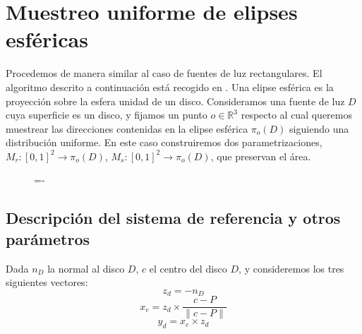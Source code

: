 \section{Muestreo uniforme de elipses esféricas}

Procedemos de manera similar al caso de fuentes de luz rectangulares. El algoritmo descrito a continuación está recogido en \cite{Guillen2017}. Una elipse esférica es la proyección sobre la esfera unidad de un disco. Consideramos una fuente de luz $D$ cuya superficie es un disco, y fijamos un punto $o\in\mathds{R}^3$ respecto al cual queremos muestrear las direcciones contenidas en la elipse esférica $\pi_o(D)$ siguiendo una distribución uniforme. En este caso construiremos dos parametrizaciones, $M_r:[0,1]^2\rightarrow \pi_o(D)$, $M_s:[0,1]^2\rightarrow \pi_o(D)$, que preservan el área.

\begin{figure}[h]
  \lineskip=-\fboxrule
\end{figure}

\subsection{Descripción del sistema de referencia y otros parámetros}

Dada $n_D$ la normal al disco $D$, $c$ el centro del disco $D$, y consideremos los tres siguientes vectores:
$$z_d = -n_D $$
$$x_e = z_d\times \frac{c-P}{\|c-P\|} $$
$$y_d = x_e\times z_d $$

